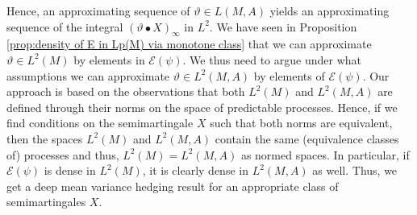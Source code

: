 \documentclass[11pt,a4paper,twoside,openany]{report}
\numberwithin{equation}{section}
\theoremstyle{plain} %
\theoremstyle{definition} %
\theoremstyle{remark} %
\begin{document}
 Hence, an approximating sequence of \(\vartheta\in L(M,A)\) yields an approximating sequence of the integral \((\vartheta\bullet X)_{\infty}\) in \(L^2\). We have seen in Proposition \ref{prop:density of E in Lp(M) via monotone class} that we can approximate \(\vartheta\in L^2(M)\) by elements in \(\mathcal{E}(\psi)\). We thus need to argue under what assumptions we can approximate \(\vartheta\in L^2(M,A)\) by elements of \(\mathcal{E}(\psi)\). Our approach is based on the observations that both \(L^2(M)\) and  \(L^2(M,A)\) are defined through their norms on the space of predictable processes. Hence, if we find conditions on the semimartingale \(X\) such that both norms are equivalent, then the spaces \(L^2(M)\) and \(L^2(M,A)\) contain the same (equivalence classes of) processes and thus, \(L^2(M)=L^2(M,A)\) as normed spaces. In particular, if \(\mathcal{E}(\psi)\) is dense in \(L^2(M)\), it is clearly dense in \(L^2(M,A)\) as well. Thus, we get a deep mean variance hedging result for an appropriate class of semimartingales \(X\). 
\end{document}

